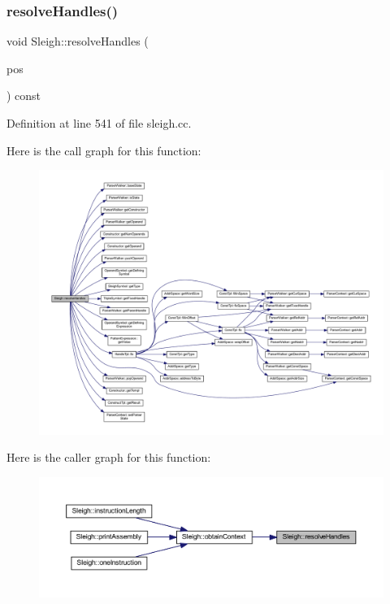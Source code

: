 \subsubsection{\texorpdfstring{resolveHandles()}{resolveHandles()}}
{\footnotesize\ttfamily void Sleigh\+::resolve\+Handles (\begin{DoxyParamCaption}\item[{\mbox{\hyperlink{class_parser_context}{Parser\+Context}} \&}]{pos }\end{DoxyParamCaption}) const\hspace{0.3cm}{\ttfamily [protected]}}



Definition at line 541 of file sleigh.\+cc.

Here is the call graph for this function\+:
\nopagebreak
\begin{figure}[H]
\begin{center}
\leavevmode
\includegraphics[width=350pt]{class_sleigh_a6feb982ab58134d1ad3730d9e252906c_cgraph}
\end{center}
\end{figure}
Here is the caller graph for this function\+:
\nopagebreak
\begin{figure}[H]
\begin{center}
\leavevmode
\includegraphics[width=350pt]{class_sleigh_a6feb982ab58134d1ad3730d9e252906c_icgraph}
\end{center}
\end{figure}
\mbox{\label{class_sleigh_ac44342619fef0c42a0f65c415683e58e}} 
